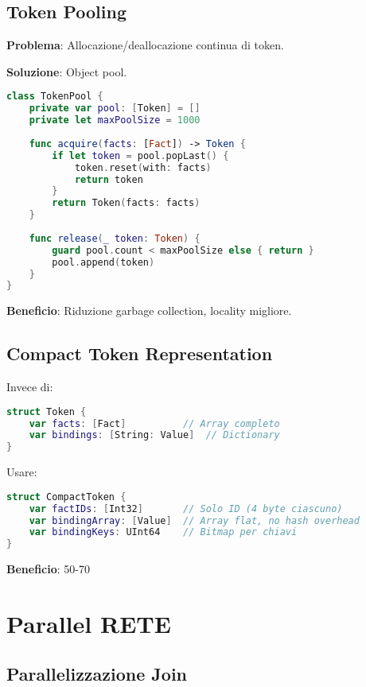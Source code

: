 \subsection{Token Pooling}

\textbf{Problema}: Allocazione/deallocazione continua di token.

\textbf{Soluzione}: Object pool.

\begin{lstlisting}[language=Swift]
class TokenPool {
    private var pool: [Token] = []
    private let maxPoolSize = 1000
    
    func acquire(facts: [Fact]) -> Token {
        if let token = pool.popLast() {
            token.reset(with: facts)
            return token
        }
        return Token(facts: facts)
    }
    
    func release(_ token: Token) {
        guard pool.count < maxPoolSize else { return }
        pool.append(token)
    }
}
\end{lstlisting}

\textbf{Beneficio}: Riduzione garbage collection, locality migliore.

\subsection{Compact Token Representation}

Invece di:
\begin{lstlisting}[language=Swift]
struct Token {
    var facts: [Fact]          // Array completo
    var bindings: [String: Value]  // Dictionary
}
\end{lstlisting}

Usare:
\begin{lstlisting}[language=Swift]
struct CompactToken {
    var factIDs: [Int32]       // Solo ID (4 byte ciascuno)
    var bindingArray: [Value]  // Array flat, no hash overhead
    var bindingKeys: UInt64    // Bitmap per chiavi
}
\end{lstlisting}

\textbf{Beneficio}: 50-70%

\section{Parallel RETE}

\subsection{Parallelizzazione Join}

